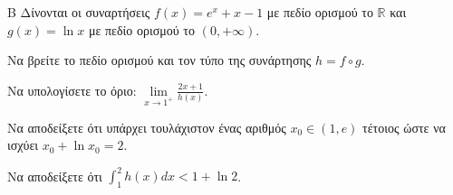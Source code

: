 \begin{thema}{Β}
Δίνονται οι συναρτήσεις $f(x) = e^x + x - 1$ με πεδίο ορισμού το $\mathbb{R}$ και $g(x) = \ln x$ με πεδίο ορισμού το $(0, +\infty)$.
\begin{erwthma}
\item Να βρείτε το πεδίο ορισμού και τον τύπο της συνάρτησης $h = f \circ g$.
\item Να υπολογίσετε το όριο: $\lim\limits_{x \to 1^+} \frac{2x+1}{h(x)}$.
\item Να αποδείξετε ότι υπάρχει τουλάχιστον ένας αριθμός $x_0 \in (1, e)$ τέτοιος ώστε να ισχύει $x_0 + \ln x_0 = 2$.
\item Να αποδείξετε ότι $\displaystyle\int_{1}^{2} h(x) dx < 1 + \ln 2$.
\end{erwthma}
\end{thema}
